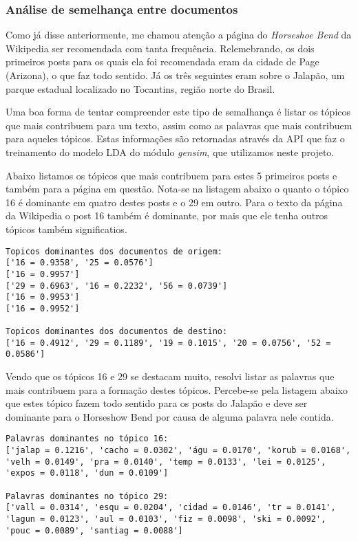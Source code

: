 \subsubsection{Análise de semelhança entre documentos}

Como já disse anteriormente, me chamou atenção a página do \textit{Horseshoe Bend} da Wikipedia ser recomendada com tanta frequência.
Relemebrando, os dois primeiros posts para os quais ela foi recomendada eram da cidade de Page (Arizona), o que faz todo sentido. Já 
os três seguintes eram sobre o Jalapão, um parque estadual localizado no Tocantins, região norte do Brasil.

Uma boa forma de tentar compreender este tipo de semalhança é listar os tópicos que mais contribuem para um texto, assim como as palavras que mais 
contribuem para aqueles tópicos. Estas informações são retornadas através da API que faz o treinamento do modelo LDA do módulo \textit{gensim},
que utilizamos neste projeto.

Abaixo listamos os tópicos que mais contribuem para estes 5 primeiros posts e também para a página em questão. Nota-se na listagem 
abaixo o quanto o tópico 16 é dominante em quatro destes posts e o 29 em outro. Para o texto da página da Wikipedia o post 16 também é dominante, 
por mais que ele tenha outros tópicos também significatios.

\begin{lstlisting}
Topicos dominantes dos documentos de origem:
['16 = 0.9358', '25 = 0.0576']
['16 = 0.9957']
['29 = 0.6963', '16 = 0.2232', '56 = 0.0739']
['16 = 0.9953']
['16 = 0.9952']

Topicos dominantes dos documentos de destino:
['16 = 0.4912', '29 = 0.1189', '19 = 0.1015', '20 = 0.0756', '52 = 0.0586'] 
\end{lstlisting}

Vendo que os tópicos 16 e 29 se destacam muito, resolvi listar as palavras que mais contribuem para a formação destes tópicos. Percebe-se pela listagem
abaixo que estes tópico fazem todo sentido para os posts do Jalapão e deve ser dominante para o Horseshow Bend por causa de alguma palavra nele contida.

\begin{lstlisting}
Palavras dominantes no tópico 16:
['jalap = 0.1216', 'cacho = 0.0302', 'águ = 0.0170', 'korub = 0.0168', 'velh = 0.0149', 'pra = 0.0140', 'temp = 0.0133', 'lei = 0.0125', 'expos = 0.0118', 'dun = 0.0109']

Palavras dominantes no tópico 29:
['vall = 0.0314', 'esqu = 0.0204', 'cidad = 0.0146', 'tr = 0.0141', 'lagun = 0.0123', 'aul = 0.0103', 'fiz = 0.0098', 'ski = 0.0092', 'pouc = 0.0089', 'santiag = 0.0088']
\end{lstlisting}

